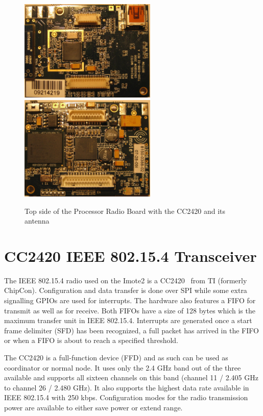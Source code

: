 \begin{figure}
  \begin{center}
    \includegraphics[width=6.5cm]{images/imote_top_cutted}
    \includegraphics[width=6.5cm]{images/imote_bottom_cutted}
    \caption{Top side of the Processor Radio Board with the CC2420 and its antenna}
        \label{fig:imote2top}
  \end{center}
\end{figure}

\section{CC2420 IEEE 802.15.4 Transceiver}
\label{cc2420}
The IEEE 802.15.4 radio used on the Imote2 is a CC2420~\cite{cc2420} from TI (formerly ChipCon).
Configuration and data transfer is done over SPI while some extra signalling
GPIOs are used for interrupts. The hardware also features a FIFO for transmit as
well as for receive. Both FIFOs have a size of 128 bytes which is the maximum
transfer unit in IEEE 802.15.4. Interrupts are generated once a start frame delimiter
(SFD) has been recognized, a full packet has arrived in the FIFO or when a FIFO is
about to reach a specified threshold.

The CC2420 is a full-function device (FFD) and as such can be used as
coordinator or normal node. It uses only the 2.4 GHz band out of the three
available and supports all sixteen channels on this band (channel 11 / 2.405 GHz
to channel 26 / 2.480 GHz). It also supports the highest data rate available
in IEEE 802.15.4 with 250 kbps. Configuration modes for the radio transmission power
are available to either save power or extend range.


